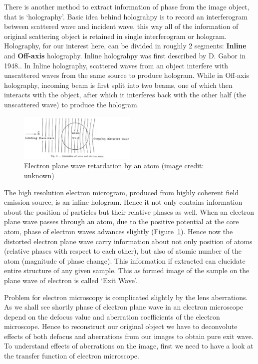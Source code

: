 There is another method to extract information of phase from the image object, that is `holography'. 
Basic idea behind holograhpy is to record an interferogram between scattered wave and incident wave, this way all of the information of original scattering object is retained in single interferogram or hologram.
Holography, for our interest here, can be divided in roughly 2 segments:
\textbf{Inline} and \textbf{Off-axis} holography.
Inline holograhpy was first described by D. Gabor in 1948.\cite{Gabor1948}.
In Inline holography, scattered waves from an object interfere with unscattered waves from the same source to produce hologram.
While in Off-axis holography, incoming beam is first split into two beams, one of which then interacts with the object, after which it interferes back with the other half (the unscattered wave) to produce the hologram.

\begin{figure}
    \centering
    \includegraphics[width=0.5\textwidth]{figures/electronphase.pdf}
    \caption{Electron plane wave retardation by an atom (image credit: unknown)}
    \label{fig:electronphase}
\end{figure}

The high resolution electron microgram, produced from highly coherent field emission source, is an inline hologram.
Hence it not only contains information about the position of particles but their relative phases as well.
When an electron plane wave passes through an atom, due to the positive potential at the core atom, phase of electron waves advances slightly (Figure~\ref{fig:electronphase}).
Hence now the distorted electron plane wave carry information about not only position of atoms (relative phases with respect to each other), but also of atomic number of the atom (magnitude of phase change).
This information if extracted can elucidate entire structure of any given sample.
This as formed image of the sample on the plane wave of electron is called `Exit Wave'.

Problem for electron microscopy is complicated slightly by the lens aberrations.
As we shall see shortly phase of electron plane wave in an electron microscope depend on the defocus value and aberration coefficients of the electron microscope.
Hence to reconstruct our original object we have to deconvolute effects of both defocus and aberrations from our images to obtain pure exit wave.
To understand effects of aberrations on the image, first we need to have a look at the transfer function of electron microscope.


